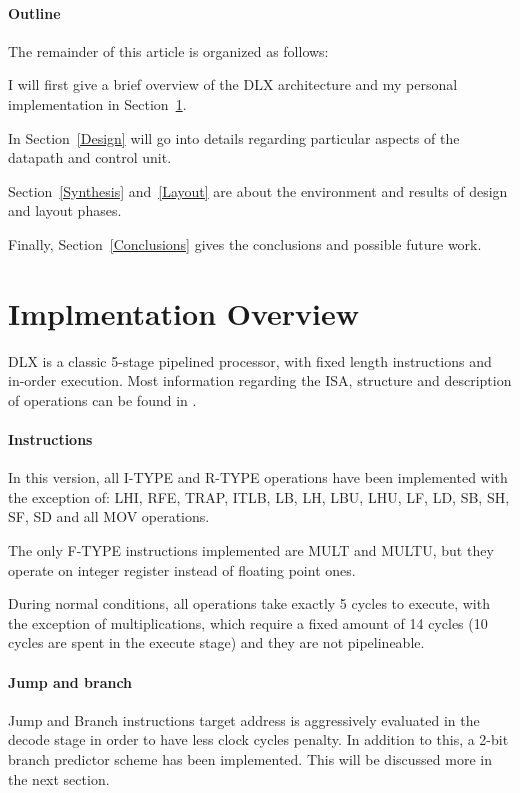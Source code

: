 \documentclass[12pt]{article}
\begin{document}
\paragraph{Outline}
The remainder of this article is organized as follows:
 
I will first give a brief overview of the DLX architecture and my personal implementation in Section~\ref{Overview}.

In Section~\ref{Design} will go into details regarding particular aspects of the datapath and control unit.

Section~\ref{Synthesis} and~\ref{Layout} are about the environment and results of design and layout phases.

Finally, Section~\ref{Conclusions} gives the conclusions and possible future work.


\section{Implmentation Overview}\label{Overview}
DLX is a classic 5-stage pipelined processor, with fixed length instructions and in-order execution.
Most information regarding the ISA, structure and description of operations can be found in \cite{ISA}.
\paragraph{Instructions}
In this version, all I-TYPE and R-TYPE operations have been implemented with the exception of: LHI, RFE, TRAP, ITLB, LB, LH, LBU, LHU, LF, LD, SB, SH, SF, SD and all MOV operations.

The only F-TYPE instructions implemented are MULT and MULTU, but they operate on integer register instead of floating point ones.

During normal conditions, all operations take exactly 5 cycles to execute, with the exception of multiplications, which require a fixed amount of 14 cycles (10 cycles are spent in the execute stage) and they are not pipelineable.

\paragraph{Jump and branch}
Jump and Branch instructions target address is aggressively evaluated in the decode stage in order to have less clock cycles penalty.
In addition to this, a 2-bit branch predictor scheme has been implemented. This will be discussed more in the next section.
\end{document}
